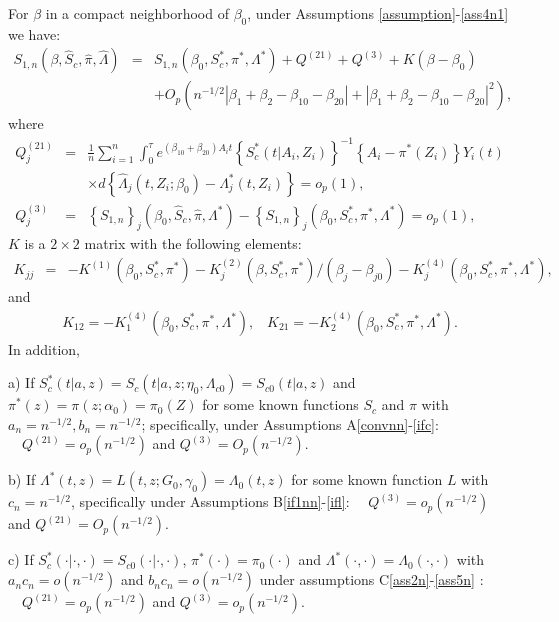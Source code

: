 \documentclass[11pt]{article}
\newcommand{\ee}{\end{eqnarray}}
\newcommand{\eqnn}{\begin{eqnarray*}}
\newcommand{\een}{\end{eqnarray*}}
\newcommand{\be}{\begin{eqnarray}}
\begin{document}
\begin{lemmas}\label{lm:deco}
For ${\beta}$ in a compact neighborhood of ${\beta}_{0}$, under Assumptions \ref{assumption}-\ref{ass4n1} we have:
\eqnn
{S}_{1,n}(\beta, \hat S_c,  \hat \pi, \hat \Lambda)&=&{S}_{1,n}(\beta_0, S^{*}_c,  \pi^{*}, \Lambda^{*})+{Q}^{(21)}+{Q}^{(3)}+{K}({\beta}-{\beta}_0)\\
&&+O_p\left(n^{-1/2}\left|\beta_1+\beta_2-\beta_{10}-\beta_{20}\right|+\left|\beta_1+\beta_2-\beta_{10}-\beta_{20}\right|^2\right),
\een
where
\be
Q^{(21)}_j&=&\frac{1}{n}\sum_{i=1}^n\int_0^\tau e^{ (\beta_{10}  + \beta_{20}) A_i t}\left\{S^{*}_c(t | A_i,Z_i)\right\}^{-1}\left\{A_i -\pi^{*}( Z_i)\right\}Y_i(t)\nonumber
\\
&&\times d\left\{\hat \Lambda_{j}(t, Z_i ; \beta_0)-\Lambda^{*}_{j}(t, Z_i)\right\}=o_p(1),\\
Q^{(3)}_j &=& \left\{{S}_{1,n}\right\}_j(\beta_0, \hat S_c,  \hat \pi, \Lambda^{*})-\left\{{S}_{1,n}\right\}_j(\beta_0, S^{*}_c,  \pi^{*}, \Lambda^{*})=o_p(1),\ee 
 ${K}$ is a $2\times2$ matrix with the following elements:
\eqnn
{K}_{jj}&=&-K^{(1)}(\beta_0,S^{*}_c, \pi^{*})-K^{(2)}_j(\beta,S^{*}_c, \pi^{*})/(\beta_j-\beta_{j0})-K^{(4)}_j(\beta_0,S^{*}_c, \pi^{*},\Lambda^{*}),
\een
and
\eqnn
{K}_{12}=-K^{(4)}_{1}(\beta_0,S^{*}_c, \pi^{*},\Lambda^{*}),\;\;\;{K}_{21}=-K^{(4)}_{2}(\beta_0,S^{*}_c, \pi^{*},\Lambda^{*}).
\een
In addition, 

a) If $S^{*}_c(t | a,z)=S_{c}(t | a,z ; \eta_0, \Lambda_{c0})=S_{c0}(t | a,z)$ and $\pi^{*}(z)=\pi(z ; \alpha_0)=\pi_0(Z)$ %
for some known functions $S_c$ and $\pi$ with $a_n=n^{-1/2},b_n=n^{-1/2}$; specifically, under Assumptions A\ref{convnn}-\ref{ifc}: $\quad Q^{(21)}=o_p(n^{-1/2})$ and $Q^{(3)}=O_p(n^{-1/2})$.

b) If $\Lambda^{*}(t,z)=L(t,z ; G_{0} , \gamma_{0})=\Lambda_0(t, z)$
for some known function $L$ with $c_n=n^{-1/2}$, specifically under Assumptions B\ref{if1nn}-\ref{ifl}: $\quad Q^{(3)}=o_p(n^{-1/2})$ and $Q^{(21)}=O_p(n^{-1/2})$.

c) If $S_c^{*}(\cdot|\cdot,\cdot)=S_{c0}(\cdot|\cdot,\cdot)$, $\pi^{*}(\cdot)=\pi_0(\cdot)$ and $\Lambda^{*}(\cdot,\cdot)=\Lambda_0(\cdot,\cdot)$ with $a_nc_n=o(n^{-1/2})$ and $b_nc_n=o(n^{-1/2})$ under assumptions C\ref{ass2n}-\ref{ass5n} : $\quad Q^{(21)}=o_p(n^{-1/2})$ and $Q^{(3)}=o_p(n^{-1/2})$.
\end{lemmas}
\end{document}
